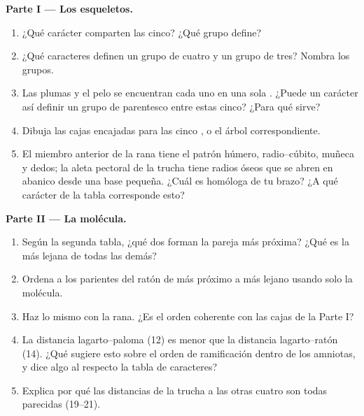 \begin{problem}
\medskip
\noindent\textbf{Parte I --- Los esqueletos.}
\begin{enumerate}
  \item ¿Qué carácter comparten las cinco? ¿Qué grupo define?
  \item ¿Qué caracteres definen un grupo de cuatro y un grupo de tres?
        Nombra los grupos.
  \item Las plumas y el pelo se encuentran cada uno en una sola
        . ¿Puede un carácter así definir un grupo de parentesco
        entre estas cinco? ¿Para qué sirve?
  \item Dibuja las cajas encajadas para las cinco , o el árbol
        correspondiente.
  \item El miembro anterior de la rana tiene el patrón húmero,
        radio--cúbito, muñeca y dedos; la aleta pectoral de la trucha
        tiene radios óseos que se abren en abanico desde una base
        pequeña. ¿Cuál es homóloga de tu brazo? ¿A qué carácter de la
        tabla corresponde esto?
\end{enumerate}

\medskip
\noindent\textbf{Parte II --- La molécula.}
\begin{enumerate}[resume]
  \item Según la segunda tabla, ¿qué dos  forman la pareja más
        próxima? ¿Qué  es la más lejana de todas las demás?
  \item Ordena a los parientes del ratón de más próximo a más lejano
        usando solo la molécula.
  \item Haz lo mismo con la rana. ¿Es el orden coherente con las cajas
        de la Parte I?
  \item La distancia lagarto--paloma (12) es menor que la distancia
        lagarto--ratón (14). ¿Qué sugiere esto sobre el orden de
        ramificación dentro de los amniotas, y dice algo al respecto la
        tabla de caracteres?
  \item Explica por qué las distancias de la trucha a las otras cuatro
        son todas parecidas (19--21).
\end{enumerate}


\end{problem}
